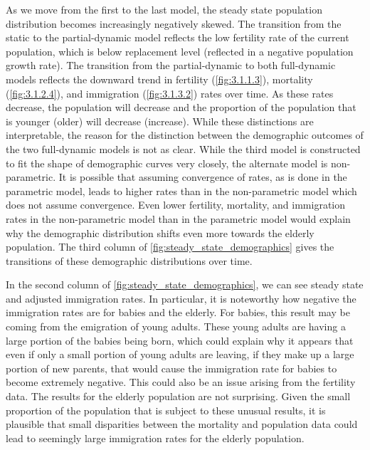 \documentclass[10pt]{article}
\numberwithin{equation}{subsection}
\begin{document}
\par As we move from the first to the last model, the steady state population distribution becomes increasingly negatively skewed. The transition from the static to the partial-dynamic model reflects the low fertility rate of the current population, which is below replacement level (reflected in a negative population growth rate). The transition from the partial-dynamic to both full-dynamic models reflects the downward trend in fertility (\autoref{fig:3.1.1.3}), mortality (\autoref{fig:3.1.2.4}), and immigration (\autoref{fig:3.1.3.2}) rates over time. As these rates decrease, the population will decrease and the proportion of the population that is younger (older) will decrease (increase). While these distinctions are interpretable, the reason for the distinction between the demographic outcomes of the two full-dynamic models is not as clear. While the third model is constructed to fit the shape of demographic curves very closely, the alternate model is non-parametric. It is possible that assuming convergence of rates, as is done in the parametric model, leads to higher rates than in the non-parametric model which does not assume convergence. Even lower fertility, mortality, and immigration rates in the non-parametric model than in the parametric model would explain why the demographic distribution shifts even more towards the elderly population. The third column of \autoref{fig:steady_state_demographics} gives the transitions of these demographic distributions over time.

\par In the second column of \autoref{fig:steady_state_demographics}, we can see steady state and adjusted immigration rates. In particular, it is noteworthy how negative the immigration rates are for babies and the elderly. For babies, this result may be coming from the emigration of young adults. These young adults are having a large portion of the babies being born, which could explain why it appears that even if only a small portion of young adults are leaving, if they make up a large portion of new parents, that would cause the immigration rate for babies to become extremely negative. This could also be an issue arising from the fertility data. The results for the elderly population are not surprising. Given the small proportion of the population that is subject to these unusual results, it is plausible that small disparities between the mortality and population data could lead to seemingly large immigration rates for the elderly population.
\end{document}
